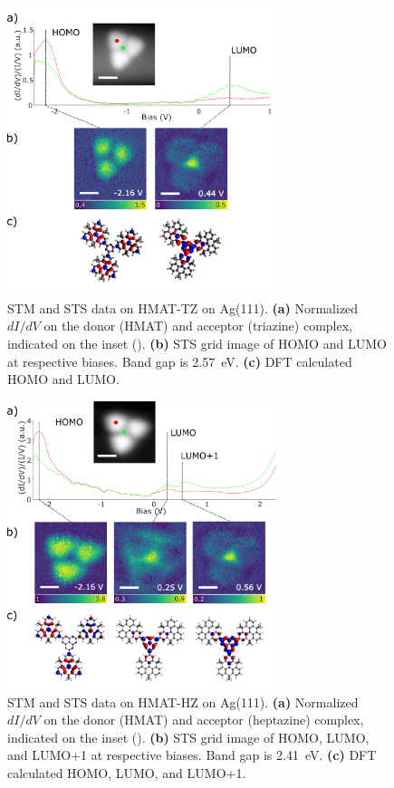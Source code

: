 \begin{figure} [H] 
    \centering
    \includegraphics[width=0.7\textwidth]{pictures/HMAT3N_diagram.png}
    \caption{STM and STS data on HMAT-TZ on Ag(111). \textbf{(a)} Normalized $dI/dV$ on the donor (HMAT) and acceptor (triazine) complex, indicated on the inset (). \textbf{(b)} STS grid image of HOMO and LUMO at respective biases. Band gap is \SI{2.57}{eV}. \textbf{(c)} DFT calculated HOMO and LUMO.}
    \label{fig:oled:hmat-tz}
\end{figure}

\begin{figure} [H]
    \centering
    \includegraphics[width=0.7\textwidth]{pictures/HMAT7N_diagram.png}
    \caption{STM and STS data on HMAT-HZ on Ag(111). \textbf{(a)} Normalized $dI/dV$ on the donor (HMAT) and acceptor (heptazine) complex, indicated on the inset (). \textbf{(b)} STS grid image of HOMO, LUMO, and LUMO+1 at respective biases. Band gap is \SI{2.41}{eV}. \textbf{(c)} DFT calculated HOMO, LUMO, and LUMO+1.}
    \label{fig:oled:hmat-hz}
\end{figure}

